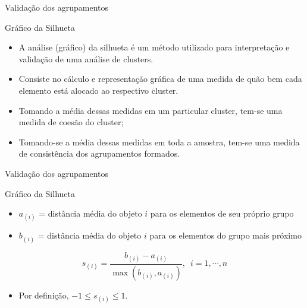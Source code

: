 \documentclass[
  ignorenonframetext,
  aspectratio=169,
]{beamer}
\providecommand{\tightlist}{%
  \setlength{\itemsep}{0pt}\setlength{\parskip}{0pt}}
\begin{document}
\begin{frame}{Validação dos agrupamentos}
\protect{}\label{validauxe7uxe3o-dos-agrupamentos-6}
\begin{block}{Gráfico da Silhueta}
\protect{}\label{gruxe1fico-da-silhueta}
\begin{itemize}
\item
  A análise (gráfico) da silhueta é um método utilizado para
  interpretação e validação de uma análise de clusters.
\item
  Consiste no cálculo e representação gráfica de uma medida de quão bem
  cada elemento está alocado ao respectivo cluster.
\item
  Tomando a média dessas medidas em um particular cluster, tem-se uma
  medida de coesão do cluster;
\item
  Tomando-se a média dessas medidas em toda a amostra, tem-se uma medida
  de consistência dos agrupamentos formados.
\end{itemize}
\end{block}
\end{frame}

\begin{frame}{Validação dos agrupamentos}
\protect{}\label{validauxe7uxe3o-dos-agrupamentos-7}
\begin{block}{Gráfico da Silhueta}
\protect{}\label{gruxe1fico-da-silhueta-1}
\begin{itemize}
\item
  \(a_{(i)}\) = distância média do objeto \(i\) para os elementos de seu
  próprio grupo
\item
  \(b_{(i)}\) = distância média do objeto \(i\) para os elementos do
  grupo mais próximo
\end{itemize}

\[s_{(i)} = \displaystyle{\dfrac{b_{(i)} - a_{(i)}}{\max(b_{(i)},a_{(i)})}}, \,\,\, i = 1, \cdots, n\]

\begin{itemize}
\tightlist
\item
  Por definição, \(-1 \leqslant s_{(i)} \leqslant 1\).
\end{itemize}
\end{block}
\end{frame}
\end{document}
